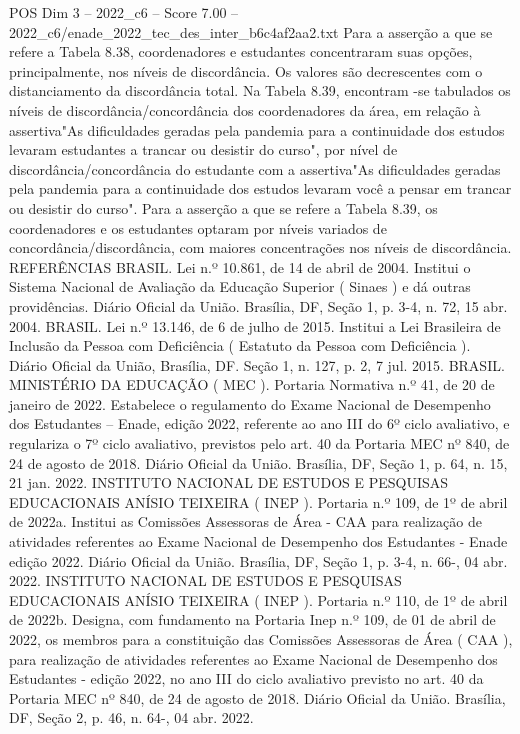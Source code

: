 \begin{textsample}{POS Dim 3 – 2022\_c6 – Score 7.00 – 2022\_c6/enade\_2022\_tec\_des\_inter\_b6c4af2aa2.txt}
Para a asserção a que se refere a Tabela 8.38, coordenadores e estudantes concentraram suas opções, principalmente, nos níveis de discordância.
Os valores são decrescentes com o distanciamento da discordância total.
Na Tabela 8.39, encontram -se tabulados os níveis de discordância/concordância dos coordenadores da área, em relação à assertiva"As dificuldades geradas pela pandemia para a continuidade dos estudos levaram estudantes a trancar ou desistir do curso", por nível de discordância/concordância do estudante com a assertiva"As dificuldades geradas pela pandemia para a continuidade dos estudos levaram você a pensar em trancar ou desistir do curso".
Para a asserção a que se refere a Tabela 8.39, os coordenadores e os estudantes optaram por níveis variados de concordância/discordância, com maiores concentrações nos níveis de discordância.
REFERÊNCIAS BRASIL.
Lei n.º 10.861, de 14 de abril de 2004.
Institui o Sistema Nacional de Avaliação da Educação Superior ( Sinaes ) e dá outras providências.
Diário Oficial da União.
Brasília, DF, Seção 1, p. 3-4, n. 72, 15 abr. 2004.
BRASIL.
Lei n.º 13.146, de 6 de julho de 2015.
Institui a Lei Brasileira de Inclusão da Pessoa com Deficiência ( Estatuto da Pessoa com Deficiência ).
Diário Oficial da União, Brasília, DF.
Seção 1, n. 127, p. 2, 7 jul. 2015.
BRASIL.
MINISTÉRIO DA EDUCAÇÃO ( MEC ).
Portaria Normativa n.º 41, de 20 de janeiro de 2022.
Estabelece o regulamento do Exame Nacional de Desempenho dos Estudantes – Enade, edição 2022, referente ao ano III do 6º ciclo avaliativo, e regulariza o 7º ciclo avaliativo, previstos pelo art. 40 da Portaria MEC nº 840, de 24 de agosto de 2018.
Diário Oficial da União.
Brasília, DF, Seção 1, p. 64, n. 15, 21 jan. 2022.
INSTITUTO NACIONAL DE ESTUDOS E PESQUISAS EDUCACIONAIS ANÍSIO TEIXEIRA ( INEP ).
Portaria n.º 109, de 1º de abril de 2022a.
Institui as Comissões Assessoras de Área - CAA para realização de atividades referentes ao Exame Nacional de Desempenho dos Estudantes - Enade edição 2022.
Diário Oficial da União.
Brasília, DF, Seção 1, p. 3-4, n. 66-, 04 abr. 2022.
INSTITUTO NACIONAL DE ESTUDOS E PESQUISAS EDUCACIONAIS ANÍSIO TEIXEIRA ( INEP ).
Portaria n.º 110, de 1º de abril de 2022b.
Designa, com fundamento na Portaria Inep n.º 109, de 01 de abril de 2022, os membros para a constituição das Comissões Assessoras de Área ( CAA ), para realização de atividades referentes ao Exame Nacional de Desempenho dos Estudantes - edição 2022, no ano III do ciclo avaliativo previsto no art. 40 da Portaria MEC nº 840, de 24 de agosto de 2018.
Diário Oficial da União.
Brasília, DF, Seção 2, p. 46, n. 64-, 04 abr. 2022.

\end{textsample}
